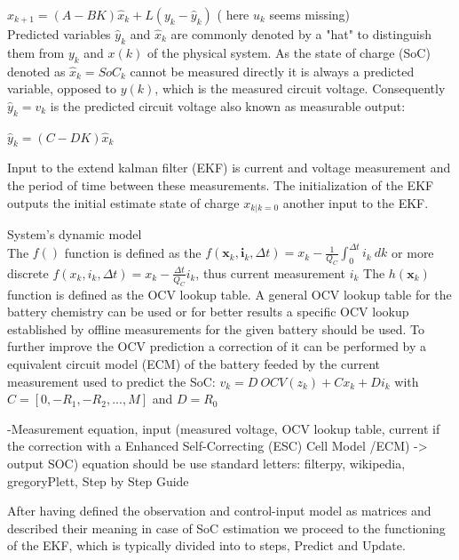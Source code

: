 $ {\hat  {x}}_{k+1}=\left(A-BK\right){\hat  {x}}_{k}+L\left(y_{k}-{\hat  {y}}_{k}\right) $  ( here $u_{k}$ seems missing)\\

Predicted variables $ \hat{y}_{k}$ and $ \hat{x}_{k} $  are commonly denoted by a "hat" to distinguish them from  $ {y}_{k} $ and $ {x}(k) $  of the physical system. As the state of charge (SoC) denoted as $\hat{x}_{k} = SoC_{k}$  cannot be measured directly it is always a predicted variable, opposed to ${y}(k)$, which is the measured circuit voltage. Consequently $ \hat{y}_{k} = {v}_{k} $ is the predicted circuit voltage also known as measurable output: 

$ {\hat{y}}_{k}=\left(C-DK\right){\hat{x}}_{k} $ 

Input to the extend kalman filter (EKF) is current and voltage measurement and the period of time between these measurements. The initialization of the EKF outputs the initial estimate state of charge  ${x}_{k|k=0} $ another input to the EKF. 

{System's dynamic model} \\
The $f() $ function is defined as the $ f({\boldsymbol {x}}_{k},{\boldsymbol {i}}_{k},\Delta{t}) = {x}_{k} - \frac{1}{{Q_{C}}}\int_{0}^{\Delta t} {i_{k}\ dk} $ or more discrete $f({x}_{k},{i}_{k},\Delta{t}) = {x}_{k} - \frac{\Delta t}{Q_{C}} i_{k} $, thus current measurement $ {i}_{k} $ 
The $h({\boldsymbol {x}}_{{k}})$ function is defined as the OCV lookup table. A general OCV lookup table for the battery chemistry can be used or for better results a specific OCV lookup established by offline measurements for  the given battery should be used. 
To further improve the OCV prediction a correction of it can be performed by a equivalent circuit model (ECM) of the battery feeded by the current measurement used to predict the SoC: 
$ {v}_{k} = {D} \ {OCV}({z}_{k}) + C {x}_{k}  +  D {i}_{k}  $ 
with $ C = [0, -R_1, -R_2, ..., M] $ and $ D = R_0 $

-Measurement equation, input (measured voltage, OCV lookup table, current if the correction with a Enhanced Self-Correcting (ESC) Cell Model /ECM) -> output SOC)
equation should be use standard letters: filterpy, wikipedia, gregoryPlett, Step by Step Guide

After having defined the observation and control-input model as matrices and described their meaning in case of SoC estimation we proceed to the functioning of the EKF, which is typically divided into to steps, Predict and Update. 

